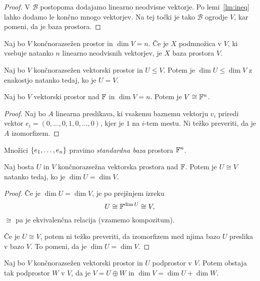 \documentclass[12pt, a4paper]{article}
\begin{document}
\begin{proof}
V $\mathcal{B}$ postopoma dodajamo linearno neodvisne vektorje. Po lemi~\ref{lm:ineq} lahko dodamo le končno mnogo vektorjev. Na tej točki je tako $\mathcal{B}$ ogrodje $V$, kar pomeni, da je baza prostora.
\end{proof}

\begin{posledica}
Naj bo $V$ končnorazsežen prostor in $\dim V=n$. Če je $X$ podmnožica v $V$, ki vsebuje natanko $n$ linearno neodvisnih vektorjev, je $X$ baza prostora $V$.
\end{posledica}

\begin{posledica}
Naj bo $V$ končnorazsežen vektorski prostor in $U\leq V$. Potem je $\dim U\leq\dim V$ z enakostjo natanko tedaj, ko je $U=V$.
\end{posledica}

\begin{izrek}
Naj bo $V$ vektorski prostor nad $\mathbb{F}$ in $\dim V=n$. Potem je $V\cong\mathbb{F}^n$.
\end{izrek}

\begin{proof}
Naj bo $A$ linearna preslikava, ki vsakemu baznemu vektorju $v_i$ priredi vektor $e_i=(0,\dots,0,1,0,\dots,0)$, kjer je $1$ na $i$-tem mestu. Ni težko preveriti, da je $A$ izomorfizem.
\end{proof}

\begin{opomba}
Množici $\left\{e_1,\dots,e_n\right\}$ pravimo \emph{standardna baza} prostora $\mathbb{F}^n$.
\end{opomba}

\begin{izrek}
Naj bosta $U$ in $V$ končnorazsežna vektorska prostora nad $\mathbb{F}$. Potem je $U\cong V$ natanko tedaj, ko je $\dim U=\dim V$.
\end{izrek}

\begin{proof}
Če je $\dim U=\dim V$, je po prejšnjem izreku
\[
U\cong \mathbb{F}^{\dim U}\cong V,
\]
$\cong$ pa je ekvivalenčna relacija (vzamemo kompozitum).

Če je $U\cong V$, potem ni težko preveriti, da izomorfizem med njima bazo $U$ preslika v bazo $V$. To pomeni, da je $\dim U=\dim V$.
\end{proof}

\begin{trditev}
Naj bo $V$ končnorazsežen vektorski prostor in $U$ podprostor v $V$. Potem obstaja tak podprostor $W$ v $V$, da je $V=U\oplus W$ in $\dim V=\dim U+\dim W$.
\end{trditev}
\end{document}
